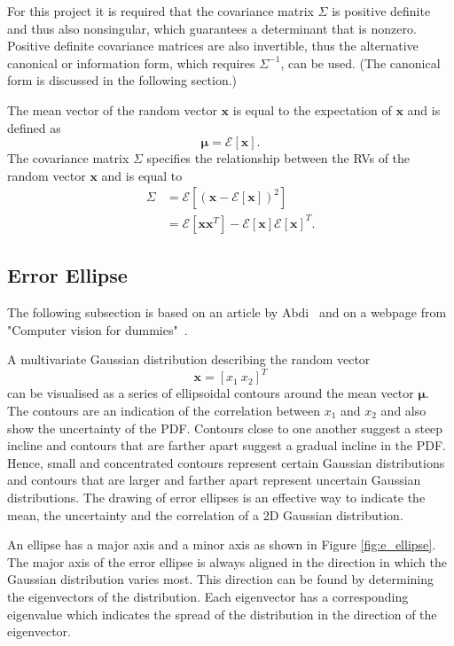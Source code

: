 \documentclass[12pt,oneside,openany,a4paper, %
afrikaans,english,
]{memoir}
\numberwithin{equation}{chapter}
\begin{document}
{For this project it is required that the covariance matrix $\Sigma$ is positive definite and thus also nonsingular, which guarantees a determinant that is nonzero. Positive definite covariance matrices are also invertible, thus the alternative canonical or information form, which requires $\Sigma^{-1}$, can be used. (The canonical form is discussed in the following section.)

The mean vector of the random vector $\bm{x}$ is equal to the expectation of $\bm{x}$ and is defined as
\begin{equation}
\bm{\mu} = \mathcal{E}[\bm{x}].
\end{equation}
The covariance matrix $\Sigma$ specifies the relationship between the RVs of the random vector $\bm{x}$ and is equal to
\begin{equation}\label{eq:defCovariance}
\begin{split}
\Sigma & = \mathcal{E}\left[(\bm{x} - \mathcal{E}[\bm{x}])^2\right]\\
& = \mathcal{E}[\bm{xx}^T] - \mathcal{E}[\bm{x}]\mathcal{E}[\bm{x}]^T.
\end{split}
\end{equation}
\subsection{Error Ellipse}The following subsection is based on an article by Abdi~\cite{abdi} and on a webpage from "Computer vision for dummies"~\cite{draw_ellipse}.

A multivariate Gaussian distribution describing the random vector
\begin{equation}
\bm{x} = [x_1\ x_2]^T
\end{equation}
can be visualised as a series of ellipsoidal contours around the mean vector $\bm{\mu}$. The contours are an indication of the correlation between $x_1$ and $x_2$ and also show the uncertainty of the PDF. Contours close to one another suggest a steep incline and contours that are farther apart suggest a gradual incline in the PDF. Hence, small and concentrated contours represent certain Gaussian distributions and contours that are larger and farther apart represent uncertain Gaussian distributions. The drawing of error ellipses is an effective way to indicate the mean, the uncertainty and the correlation of a 2D Gaussian distribution.

An ellipse has a major axis and a minor axis as shown in Figure \ref{fig:e_ellipse}. The major axis of the error ellipse is always aligned in the direction in which the Gaussian distribution varies most. This direction can be found by determining the eigenvectors of the distribution. Each eigenvector has a corresponding eigenvalue which indicates the spread of the distribution in the direction of the eigenvector. 

}
\end{document}
